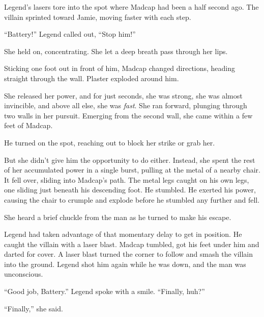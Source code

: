 Legend's lasers tore into the spot where Madcap had been a half second ago.  The villain sprinted toward Jamie, moving faster with each step.



``Battery!'' Legend called out, ``Stop him!''



She held on, concentrating.  She let a deep breath pass through her lips.



Sticking one foot out in front of him, Madcap changed directions, heading straight through the wall.  Plaster exploded around him.



She released her power, and for just seconds, she was strong, she was almost invincible, and above all else, she was \emph{fast}.  She ran forward, plunging through two walls in her pursuit.  Emerging from the second wall, she came within a few feet of Madcap.



He turned on the spot, reaching out to block her strike or grab her.



But she didn't give him the opportunity to do either.  Instead, she spent the rest of her accumulated power in a single burst, pulling at the metal of a nearby chair.  It fell over, sliding into Madcap's path.  The metal legs caught on his own legs, one sliding just beneath his descending foot.  He stumbled.  He exerted his power, causing the chair to crumple and explode before he stumbled any further and fell.\emph{  }



She heard a brief chuckle from the man as he turned to make his escape.



Legend had taken advantage of that momentary delay to get in position.  He caught the villain with a laser blast.  Madcap tumbled, got his feet under him and darted for cover.  A laser blast turned the corner to follow and smash the villain into the ground.  Legend shot him again while he was down, and the man was unconscious.



``Good job, Battery.'' Legend spoke with a smile.  ``Finally, huh?''



``Finally,'' she said.



\blacksquare



